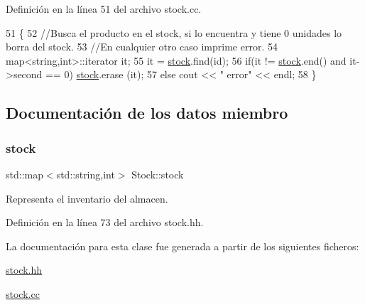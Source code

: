 Definición en la línea 51 del archivo stock.\+cc.


\begin{DoxyCode}
51                                  \{
52     \textcolor{comment}{//Busca el producto en el stock, si lo encuentra y tiene 0 unidades lo borra del stock.}
53     \textcolor{comment}{//En cualquier otro caso imprime error.}
54     map<string,int>::iterator it;
55     it = \mbox{\hyperlink{class_stock_a55cb69748a14da5fe525e55a2c656ba9}{stock}}.find(\textcolor{keywordtype}{id});
56     \textcolor{keywordflow}{if}(it != \mbox{\hyperlink{class_stock_a55cb69748a14da5fe525e55a2c656ba9}{stock}}.end() and it->second == 0) \mbox{\hyperlink{class_stock_a55cb69748a14da5fe525e55a2c656ba9}{stock}}.erase (it);
57     \textcolor{keywordflow}{else} cout << \textcolor{stringliteral}{"  error"} << endl;
58 \}
\end{DoxyCode}


\subsection{Documentación de los datos miembro}
\mbox{\label{class_stock_a55cb69748a14da5fe525e55a2c656ba9}} 
\subsubsection{\texorpdfstring{stock}{stock}}
{\footnotesize\ttfamily std\+::map$<$std\+::string,int$>$ Stock\+::stock\hspace{0.3cm}{\ttfamily [private]}}



Representa el inventario del almacen. 



Definición en la línea 73 del archivo stock.\+hh.



La documentación para esta clase fue generada a partir de los siguientes ficheros\+:\begin{DoxyCompactItemize}
\item 
\mbox{\hyperlink{stock_8hh}{stock.\+hh}}\item 
\mbox{\hyperlink{stock_8cc}{stock.\+cc}}\end{DoxyCompactItemize}
